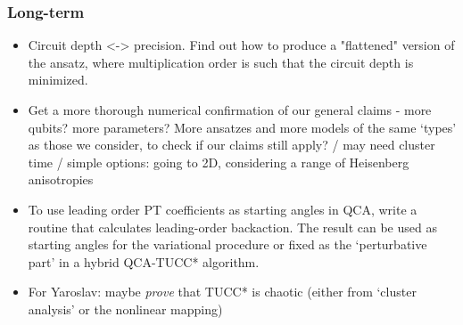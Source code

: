 \documentclass[10pt, a4paper]{article}
\begin{document}
\subsubsection*{Long-term}
\begin{itemize}

\item Circuit depth <-> precision. Find out how to produce a "flattened" version of the ansatz, where multiplication order is such that the circuit depth is minimized. 


\item Get a more thorough numerical confirmation of our general claims - more qubits? more parameters? More ansatzes and more models of the same `types' as those we consider, to check if our claims still apply? / may need cluster time / simple options: going to 2D, considering a range of Heisenberg anisotropies

\item To use leading order PT coefficients as starting angles in QCA, write a routine that calculates leading-order backaction. The result can be used as starting angles for the variational procedure or fixed as the `perturbative part' in a hybrid QCA-TUCC* algorithm.

\item For Yaroslav: maybe \textit{prove} that TUCC* is chaotic (either from `cluster analysis' or the nonlinear mapping)

\end{itemize}
\end{document}
